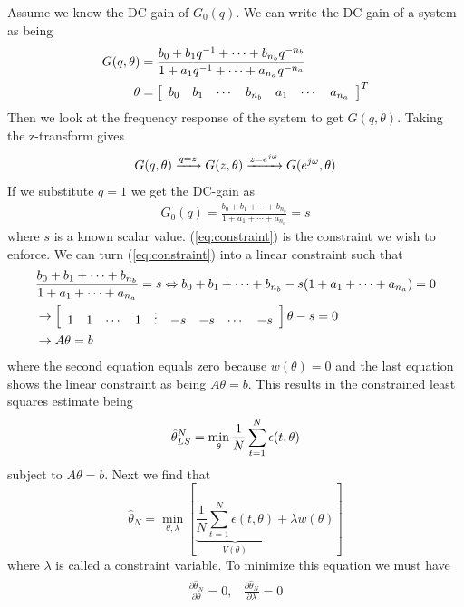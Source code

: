 \begin{example}
Assume we know the DC-gain of $G_0(q)$. We can write the DC-gain of a system as being
\begin{align*}
G(q,\theta) &= \frac{b_0+b_1q^{-1}+\cdots+b_{n_b}q^{-n_b}}{1+a_1q^{-1}+\cdots+a_{n_a}q^{-n_a}} \\
\theta &= \left[\begin{array}{c c c c c c c} b_0 & b_1 & \cdots & b_{n_b} & a_1 & \cdots & a_{n_a} \end{array}\right]^T \\
\end{align*}
Then we look at the frequency response of the system to get $G(q,\theta)$. Taking the z-transform gives
$$G(q,\theta) \xrightarrow{q=z} G(z,\theta) \xrightarrow{z=e^{j\omega}} G(e^{j\omega},\theta)$$
If we substitute $q=1$ we get the DC-gain as
\begin{align}
\label{eq:constraint}
G_0(q) = \frac{b_0+b_1+\cdots+b_{n_b}}{1+a_1+\cdots+a_{n_a}} = s
\end{align}
where $s$ is a known scalar value. (\ref{eq:constraint}) is the constraint we wish to enforce. We can turn (\ref{eq:constraint}) into a linear constraint such that
\begin{align*}
&\frac{b_0+b_1+\cdots+b_{n_b}}{1+a_1+\cdots+a_{n_a}} = s \Leftrightarrow b_0+b_1+\cdots+b_{n_b} - s(1+a_1+\cdots+a_{n_a}) = 0 \\
&\rightarrow \left[\begin{array}{c c c c c c c c c} 1 & 1 & \cdots & 1 & \vdots & -s & -s & \cdots & -s \end{array}\right]\theta-s=0 \\
&\rightarrow A\theta = b
\end{align*}
where the second equation equals zero because $w(\theta)=0$ and the last equation shows the linear constraint as being $A\theta=b$. This results in the constrained least squares estimate being
$$\hat{\theta}_{LS}^N = \min_\theta\frac{1}{N}\sum_{t=1}^N\epsilon(t,\theta)$$
subject to $A\theta=b$. Next we find that
$$\hat{\theta}_N = \min_{\theta,\lambda}[\underbrace{\frac{1}{N}\sum_{t=1}^N\epsilon(t,\theta)}_{V(\theta)} +\lambda w(\theta)]$$
where $\lambda$ is called a constraint variable. To minimize this equation we must have
\begin{align*}
\begin{split}
\frac{\partial\hat{\theta}_N}{\partial\theta}=0,
\end{split}
\begin{split}
\frac{\partial\hat{\theta}_N}{\partial\lambda}=0

\end{split}
\end{align*}
\end{example}
